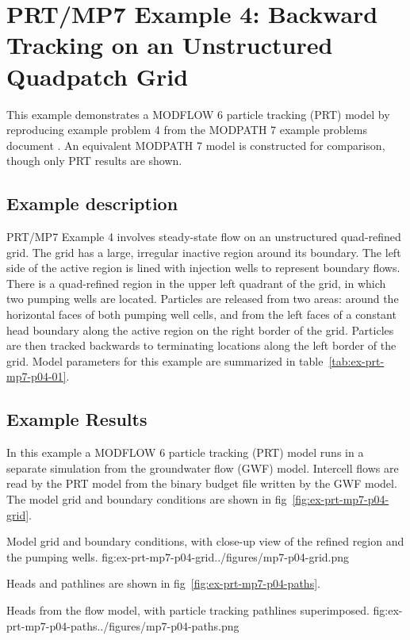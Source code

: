 \section{PRT/MP7 Example 4: Backward Tracking on an Unstructured Quadpatch Grid}

This example demonstrates a MODFLOW 6 particle tracking (PRT) model by reproducing example problem 4 from the MODPATH 7 \citep{pollock2016modpath7} example problems document \citep{modpath7examples}. An equivalent MODPATH 7 model is constructed for comparison, though only PRT results are shown.

\subsection{Example description}

PRT/MP7 Example 4 involves steady-state flow on an unstructured quad-refined grid. The grid has a large, irregular inactive region around its boundary. The left side of the active region is lined with injection wells to represent boundary flows. There is a quad-refined region in the upper left quadrant of the grid, in which two pumping wells are located. Particles are released from two areas: around the horizontal faces of both pumping well cells, and from the left faces of a constant head boundary along the active region on the right border of the grid. Particles are then tracked backwards to terminating locations along the left border of the grid. Model parameters for this example are summarized in table~\ref{tab:ex-prt-mp7-p04-01}.



\subsection{Example Results}

In this example a MODFLOW 6 particle tracking (PRT) model runs in a separate simulation from the groundwater flow (GWF) model. Intercell flows are read by the PRT model from the binary budget file written by the GWF model. The model grid and boundary conditions are shown in fig~\ref{fig:ex-prt-mp7-p04-grid}.

\begin{StandardFigure}{
    Model grid and boundary conditions, with close-up view of the refined region and the pumping wells.
    }{fig:ex-prt-mp7-p04-grid}{../figures/mp7-p04-grid.png}
\end{StandardFigure}

Heads and pathlines are shown in fig~\ref{fig:ex-prt-mp7-p04-paths}.

\begin{StandardFigure}{
    Heads from the flow model, with particle tracking pathlines superimposed.
    }{fig:ex-prt-mp7-p04-paths}{../figures/mp7-p04-paths.png}
\end{StandardFigure}